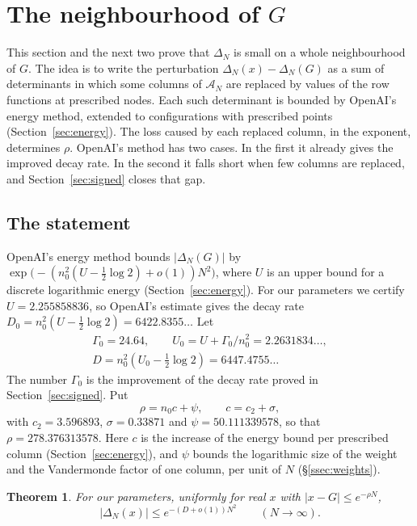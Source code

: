 \documentclass[11pt]{amsart}
\newcommand{\Rho}{278.376313578}
\newcommand{\Ctwo}{3.596893}
\newcommand{\Sigm}{0.33871}
\newcommand{\Psiw}{50.111339578}
\newcommand{\Utarget}{2.255858836}
\newcommand{\Gain}{24.64}
\newcommand{\Uzero}{2.2631834}
\newcommand{\Decay}{6447.4755}
\newcommand{\DecayOA}{6422.8355}
\newtheorem{theorem}{Theorem}[section]
\theoremstyle{definition}
\theoremstyle{remark}
\numberwithin{equation}{section}
\newcommand{\cA}{\mathcal A}
\begin{document}
\section{The neighbourhood of $G$}\label{sec:real}

This section and the next two prove that $\Delta_N$ is small on a whole neighbourhood of $G$. The idea is to
write the perturbation $\Delta_N(x)-\Delta_N(G)$ as a sum of determinants in which some columns of $\cA_N$
are replaced by values of the row functions at prescribed nodes. Each such determinant is bounded by
OpenAI's energy method, extended to configurations with prescribed points (Section~\ref{sec:energy}). The
loss caused by each replaced column, in the exponent, determines $\rho$. OpenAI's method has two cases. In
the first it already gives the improved decay rate. In the second it falls short when few columns are
replaced, and Section~\ref{sec:signed} closes that gap.

\subsection{The statement}
OpenAI's energy method bounds $|\Delta_N(G)|$ by $\exp\bigl(-(n_0^2(U-\frac12\log2)+o(1))N^2\bigr)$, where $U$
is an upper bound for a discrete logarithmic energy (Section~\ref{sec:energy}). For our parameters we
certify $U=\Utarget$, so OpenAI's estimate gives the decay rate $D_0=n_0^2(U-\frac12\log2)=\DecayOA\ldots$
Let
\begin{gather*}
 \Gamma_0=\Gain,\qquad U_0=U+\Gamma_0/n_0^2=\Uzero\ldots,\\
 D=n_0^2(U_0-\tfrac12\log2)=\Decay\ldots
\end{gather*}
The number $\Gamma_0$ is the improvement of the decay rate proved in Section~\ref{sec:signed}. Put
\begin{equation}\label{eq:rho-def}
 \rho=n_0c+\psi,\qquad c=c_2+\sigma,
\end{equation}
with $c_2=\Ctwo$, $\sigma=\Sigm$ and $\psi=\Psiw$,
so that $\rho=\Rho$. Here $c$ is the increase of the energy bound per prescribed column
(Section~\ref{sec:energy}), and $\psi$ bounds the logarithmic size of the weight and the Vandermonde factor
of one column, per unit of $N$ (\S\ref{ssec:weights}).

\begin{theorem}\label{thm:real}
For our parameters, uniformly for real $x$ with $|x-G|\le e^{-\rho N}$,
\[
 |\Delta_N(x)|\le e^{-(D+o(1))N^2}\qquad(N\to\infty).
\]
\end{theorem}
\end{document}
